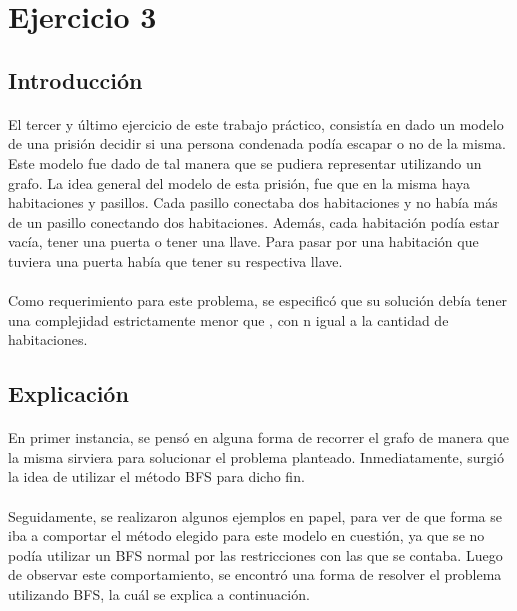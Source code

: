 \section{Ejercicio 3}

\subsection{Introducción}

\paragraph{}
El tercer y último ejercicio de este trabajo práctico, consistía en dado un modelo de una prisión decidir si una persona condenada podía escapar o no de la misma. Este modelo fue dado de tal manera que se pudiera representar utilizando un grafo. La idea general del modelo de esta prisión, fue que en la misma haya habitaciones y pasillos. Cada pasillo conectaba dos habitaciones y no había más de un pasillo conectando dos habitaciones. Además, cada habitación podía estar vacía, tener una puerta o tener una llave. Para pasar por una habitación que tuviera una puerta había que tener su respectiva llave.

\paragraph{}
Como requerimiento para este problema, se especificó que su solución debía tener una complejidad estrictamente menor que , con n igual a la cantidad de habitaciones.


\subsection{Explicación}
\label{explicacion3}

\paragraph{}
En primer instancia, se pensó en alguna forma de recorrer el grafo de manera que la misma sirviera para solucionar el problema planteado. Inmediatamente, surgió la idea de utilizar el método BFS para dicho fin.

\paragraph{}
Seguidamente, se realizaron algunos ejemplos en papel, para ver de que forma se iba a comportar el método elegido para este modelo en cuestión, ya que se no podía utilizar un BFS normal por las restricciones con las que se contaba. Luego de observar este comportamiento, se encontró una forma de resolver el problema utilizando BFS, la cuál se explica a continuación.

